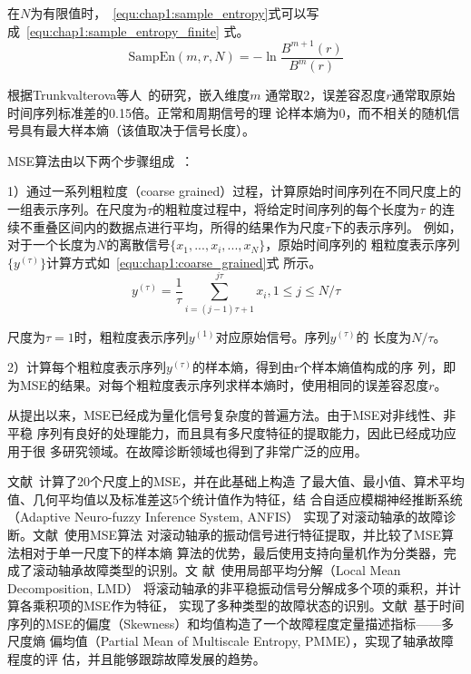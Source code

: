 在$N$为有限值时，~\ref{equ:chap1:sample_entropy}式可以写成~\ref{equ:chap1:sample_entropy_finite}
式。
\begin{equation}
  \label{equ:chap1:sample_entropy_finite}
  \text{SampEn}(m, r, N) = -\ln\frac{B^{m+1}(r)}{B^m(r)}
\end{equation}

根据Trunkvalterova等人~\cite{trunkvalterova2008reduced}的研究，嵌入维度$m$
通常取2，误差容忍度$r$通常取原始时间序列标准差的0.15倍。正常和周期信号的理
论样本熵为0，而不相关的随机信号具有最大样本熵（该值取决于信号长度）。

MSE算法由以下两个步骤组成~\cite{costa2002multiscale, costa2005multiscale}：

1）通过一系列粗粒度（coarse grained）过程，计算原始时间序列在不同尺度上的
一组表示序列。在尺度为$\tau$的粗粒度过程中，将给定时间序列的每个长度为$\tau$
的连续不重叠区间内的数据点进行平均，所得的结果作为尺度$\tau$下的表示序列。
例如，对于一个长度为$N$的离散信号$\{x_1,...,x_i,...,x_N\}$，原始时间序列的
粗粒度表示序列$\{y^{(\tau)}\}$计算方式如~\ref{equ:chap1:coarse_grained}式
所示。
\begin{equation}
  \label{equ:chap1:coarse_grained}
  y^{(\tau)} = \frac{1}{\tau}\sum_{i=(j-1)\tau + 1}^{j\tau}x_i , 1\leq j\leq N/\tau
\end{equation}

尺度为$\tau=1$时，粗粒度表示序列$y^{(1)}$对应原始信号。序列$y^{(\tau)}$的
长度为$N/\tau$。

2）计算每个粗粒度表示序列$y^{(\tau)}$的样本熵，得到由r个样本熵值构成的序
列，即为MSE的结果。对每个粗粒度表示序列求样本熵时，使用相同的误差容忍度$r$。

从提出以来，MSE已经成为量化信号复杂度的普遍方法。由于MSE对非线性、非平稳
序列有良好的处理能力，而且具有多尺度特征的提取能力，因此已经成功应用于很
多研究领域。在故障诊断领域也得到了非常广泛的应用。

文献~计算了20个尺度上的MSE，并在此基础上构造
了最大值、最小值、算术平均值、几何平均值以及标准差这5个统计值作为特征，结
合自适应模糊神经推断系统（Adaptive Neuro-fuzzy Inference System, ANFIS）
实现了对滚动轴承的故障诊断。文献~使用MSE算法
对滚动轴承的振动信号进行特征提取，并比较了MSE算法相对于单一尺度下的样本熵
算法的优势，最后使用支持向量机作为分类器，完成了滚动轴承故障类型的识别。文
献~使用局部平均分解（Local Mean Decomposition, LMD）
将滚动轴承的非平稳振动信号分解成多个项的乘积，并计算各乘积项的MSE作为特征，
实现了多种类型的故障状态的识别。文献~基于时间
序列的MSE的偏度（Skewness）和均值构造了一个故障程度定量描述指标——多尺度熵
偏均值（Partial Mean of Multiscale Entropy, PMME），实现了轴承故障程度的评
估，并且能够跟踪故障发展的趋势。

